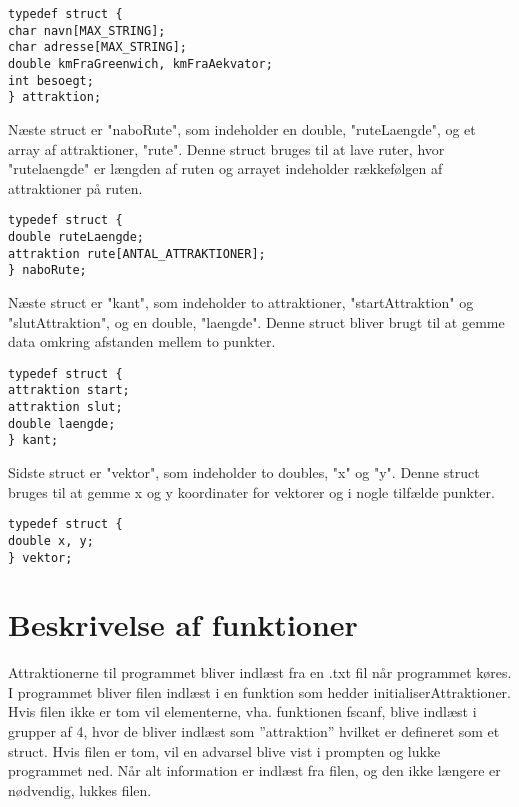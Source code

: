\begin{lstlisting}
typedef struct {
char navn[MAX_STRING];
char adresse[MAX_STRING]; 
double kmFraGreenwich, kmFraAekvator;
int besoegt;
} attraktion;
\end{lstlisting} 

Næste struct er "naboRute", som indeholder en double, "ruteLaengde", og et array af attraktioner, "rute". Denne struct bruges til at lave ruter, hvor "rutelaengde" er længden af ruten og arrayet indeholder rækkefølgen af attraktioner på ruten. \newline

\begin{lstlisting}
typedef struct {
double ruteLaengde;
attraktion rute[ANTAL_ATTRAKTIONER];
} naboRute;
\end{lstlisting}

Næste struct er "kant", som indeholder to attraktioner, "startAttraktion" og "slutAttraktion", og en double, "laengde". Denne struct bliver brugt til at gemme data omkring afstanden mellem to punkter.\newline

\begin{lstlisting}
typedef struct {
attraktion start;
attraktion slut;
double laengde;
} kant;
\end{lstlisting}

Sidste struct er "vektor", som indeholder to doubles, "x" og "y". Denne struct bruges til at gemme x og y koordinater for vektorer og i nogle tilfælde punkter. \newline

\begin{lstlisting}
typedef struct {
double x, y;
} vektor;
\end{lstlisting}

\section{Beskrivelse af funktioner}
Attraktionerne til programmet bliver indlæst fra en .txt fil når programmet køres. I programmet bliver filen indlæst i en funktion som hedder initialiserAttraktioner. Hvis filen ikke er tom vil elementerne, vha. funktionen fscanf, blive indlæst i grupper af 4, hvor de bliver indlæst som ”attraktion” hvilket er defineret som et struct. Hvis filen er tom, vil en advarsel blive vist i prompten og lukke programmet ned. Når alt information er indlæst fra filen, og den ikke længere er nødvendig, lukkes filen.\newline

